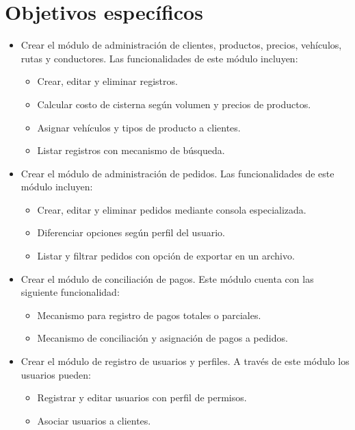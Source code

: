 \section*{Objetivos específicos}
\begin{itemize}
    \item Crear el módulo de administración de clientes, productos, precios, vehículos, rutas y conductores. Las funcionalidades de este módulo incluyen:
    \begin{itemize}
        \item Crear, editar y eliminar registros.
        \item Calcular costo de cisterna según volumen y precios de productos.
        \item Asignar vehículos y tipos de producto a clientes.
        \item Listar registros con mecanismo de búsqueda.
    \end{itemize}

    \item Crear el módulo de administración de pedidos. Las funcionalidades de este módulo incluyen:
    \begin{itemize}
        \item Crear, editar y eliminar pedidos mediante consola especializada.
        \item Diferenciar opciones según perfil del usuario.
        \item Listar y filtrar pedidos con opción de exportar en un archivo.
    \end{itemize}

    \item Crear el módulo de conciliación de pagos. Este módulo cuenta con las siguiente funcionalidad:
    \begin{itemize}
        \item Mecanismo para registro de pagos totales o parciales.
        \item Mecanismo de conciliación y asignación de pagos a pedidos.
    \end{itemize}

    \item Crear el módulo de registro de usuarios y perfiles. A través de este módulo los usuarios pueden:
    \begin{itemize}
        \item Registrar y editar usuarios con perfil de permisos.
        \item Asociar usuarios a clientes.
    \end{itemize}
\end{itemize}